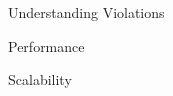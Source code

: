 \begin{frame}{Understanding Violations}
\end{frame}

\begin{frame}{Performance}
\end{frame}

\begin{frame}{Scalability}
\end{frame}

\begin{frame}{}
\end{frame}

\begin{frame}{}
\end{frame}

\begin{frame}{}
\end{frame}
